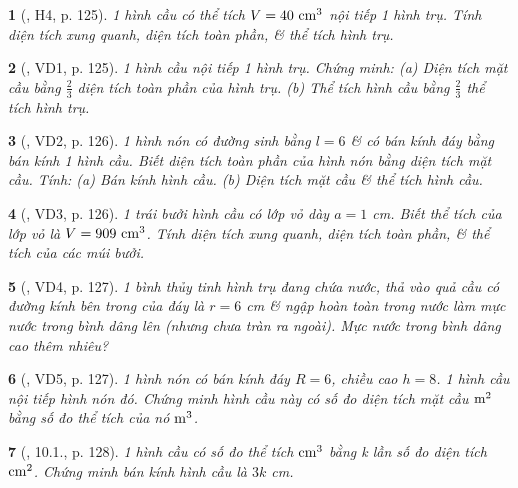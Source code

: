 \documentclass{article}
\newtheorem{baitoan}{}
\begin{document}
\begin{baitoan}[\cite{Binh_boi_duong_Toan_9_tap_2}, H4, p. 125]
	1 hình cầu có thể tích $V = 40\ {\rm cm}^3$ nội tiếp 1 hình trụ. Tính diện tích xung quanh, diện tích toàn phần, \& thể tích hình trụ.
\end{baitoan}

\begin{baitoan}[\cite{Binh_boi_duong_Toan_9_tap_2}, VD1, p. 125]
	1 hình cầu nội tiếp 1 hình trụ. Chứng minh: (a) Diện tích mặt cầu bằng $\frac{2}{3}$ diện tích toàn phần của hình trụ. (b) Thể tích hình cầu bằng $\frac{2}{3}$ thể tích hình trụ.
\end{baitoan}

\begin{baitoan}[\cite{Binh_boi_duong_Toan_9_tap_2}, VD2, p. 126]
	1 hình nón có đường sinh bằng $l = 6$ \& có bán kính đáy bằng bán kính 1 hình cầu. Biết diện tích toàn phần của hình nón bằng diện tích mặt cầu. Tính: (a) Bán kính hình cầu. (b) Diện tích mặt cầu \& thể tích hình cầu.
\end{baitoan}

\begin{baitoan}[\cite{Binh_boi_duong_Toan_9_tap_2}, VD3, p. 126]
	1 trái bưởi hình cầu có lớp vỏ dày $a = 1$ {\rm cm}. Biết thể tích của lớp vỏ là $V = 909\ {\rm cm}^3$. Tính diện tích xung quanh, diện tích toàn phần, \& thể tích của các múi bưởi.
\end{baitoan}

\begin{baitoan}[\cite{Binh_boi_duong_Toan_9_tap_2}, VD4, p. 127]
	1 bình thủy tinh hình trụ đang chứa nước, thả vào quả cầu có đường kính bên trong của đáy là $r = 6$ {\rm cm} \& ngập hoàn toàn trong nước làm mực nước trong bình dâng lên (nhưng chưa tràn ra ngoài). Mực nước trong bình dâng cao thêm nhiêu?
\end{baitoan}

\begin{baitoan}[\cite{Binh_boi_duong_Toan_9_tap_2}, VD5, p. 127]
	1 hình nón có bán kính đáy $R = 6$, chiều cao $h = 8$. 1 hình cầu nội tiếp hình nón đó. Chứng minh hình cầu này có số đo diện tích mặt cầu $\rm m^2$ bằng số đo thể tích của nó $\rm m^3$.
\end{baitoan}

\begin{baitoan}[\cite{Binh_boi_duong_Toan_9_tap_2}, 10.1., p. 128]
	1 hình cầu có số đo thể tích $\rm cm^3$ bằng k lần số đo diện tích $\rm cm^2$. Chứng minh bán kính hình cầu là $3k$ {\rm cm}.
\end{baitoan}
\end{document}
